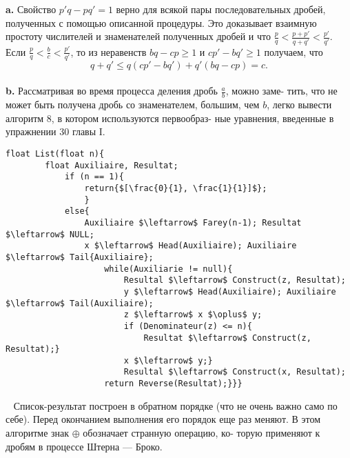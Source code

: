 \documentclass{mai_book}
\begin{document}
\textbf{a.}  Свойство $p'q - pq' = 1$ верно для всякой пары последовательных\linebreak
дробей, полученных с помощью описанной процедуры. Это доказывает\linebreak
взаимную простоту числителей и знаменателей полученных дробей и\linebreak
что $\frac{p}{q} < \frac{p + p'}{q + q'} < \frac{p'}{q'}$.\\

\hspace*{0pt}Если $\frac{p}{q} < \frac{b}{c} < \frac{p'}{q'}$, то из неравенств $bq - cp \geqslant 1$ и $cp' - bq' \geqslant 1$ получаем,\linebreak
что
$$q + q' \leqslant q(cp' - bq') + q'(bq - cp) = c.$$\\
\hspace*{15pt}\textbf{b.} Рассматривая во время процесса деления дробь $\frac{a}{b}$, можно заме­-\linebreak
тить, что не может быть получена дробь со знаменателем, большим,\linebreak
чем $b$,  легко вывести алгоритм 8, в котором используются первообраз-\linebreak
ные уравнения, введенные в упражнении 30 главы I.\\

\begin{lstlisting}[mathescape = true, caption = {Прохождение ряда Фарея}]
	float List(float n){
		float Auxiliaire, Resultat;
			if (n == 1){
				return{$[\frac{0}{1}, \frac{1}{1}]$};
				}
			else{
				Auxiliaire $\leftarrow$ Farey(n-1); Resultat $\leftarrow$ NULL;
				x $\leftarrow$ Head(Auxiliaire); Auxiliaire $\leftarrow$ Tail{Auxiliaire};
					while(Auxiliarie != null){
						Resultal $\leftarrow$ Construct(z, Resultat);
						у $\leftarrow$ Head(Auxiliaire); Auxiliaire $\leftarrow$ Tail(Auxiliaire);
						z $\leftarrow$ x $\oplus$ y;
						if (Denominateur(z) <= n){
							Resultat $\leftarrow$ Construct(z, Resultat);}
						x $\leftarrow$ y;}
						Resultal $\leftarrow$ Construct(x, Resultat);
					return Reverse(Resultat);}}}
			\end{lstlisting}
	\ \newline
\hspace*{15pt}Список-результат построен в обратном порядке (что не очень важно­\linebreak
само по себе). Перед окончанием выполнения его порядок еще раз\linebreak 
меняют. В этом алгоритме знак $\oplus$  обозначает странную операцию, ко-\linebreak
торую применяют к дробям в процессе Штерна — Броко.
\end{document}
